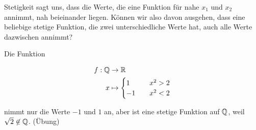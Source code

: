 \setcounter{subsection}{1}
\thispagestyle{pagenumberonly}

Stetigkeit sagt uns, dass die Werte, die eine Funktion für nahe $x_1$ und $x_2$ annimmt, nah beieinander liegen. Können wir also davon ausgehen, dass eine beliebige stetige Funktion, die zwei unterschiedliche Werte hat, auch alle Werte dazwischen annimmt?

\begin{beispiel}
    Die Funktion
    \begin{minipage}{.5\textwidth}
        \begin{align*}
            f: \mathbb{Q} &\rightarrow{} \mathbb{R}\\
            x &\mapsto
            \begin{cases}
                1\quad &x^2 > 2\\
                -1\quad &x^2 < 2
            \end{cases}
        \end{align*}
    \end{minipage}
    \begin{minipage}{.5\textwidth}
        \centering
        \begin{figure}[H]
        \end{figure}
    \end{minipage}
    nimmt nur die Werte $-1$ und $1$ an, aber ist eine stetige Funktion auf $\mathbb{Q}$, weil $\sqrt{2}\not\in\mathbb{Q}$. (Übung)
\end{beispiel}


